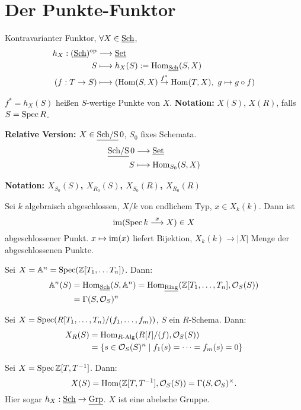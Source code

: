 \section{Der Punkte-Funktor}

Kontravarianter Funktor, $\forall X\in\operatorname{\underline{Sch}}$,
\begin{align*}
  h_{X}:(\operatorname{\underline{Sch}})^{\operatorname{op}} & \longrightarrow\operatorname{\underline{Set}}\\
  S & \longmapsto h_{X}(S):=\operatorname{\mathrm{Hom}}_{\operatorname{\underline{Sch}}}(S,X)\\
  (f:T\rightarrow S) & \longmapsto(\operatorname{\mathrm{Hom}}(S,X)\overset{f^{\ast}}{\rightarrow}\operatorname{\mathrm{Hom}}(T,X),\ g\mapsto g\circ f)
\end{align*}

$f^{\ast}=h_{X}(S)$ heißen $S$-wertige Punkte von $X$. \textbf{Notation:
}$X(S)$, $X(R)$, falls $S=\operatorname{Spec} R$.

\textbf{Relative Version:} $X\in\operatorname{\underline{Sch/S}}0$, $S_{0}$ fixes Schemata.
\begin{align*}
  \operatorname{\underline{Sch/S}}0 & \longrightarrow\operatorname{\underline{Set}}\\
  S & \longmapsto\operatorname{\mathrm{Hom}}_{S_{0}}(S,X)
\end{align*}

\textbf{Notation: $X_{S_{0}}(S)$, $X_{R_{0}}(S)$, $X_{S_{0}}(R)$,
  $X_{R_{0}}(R)$}
\begin{example}[1]
  Sei $k$ algebraisch abgeschlossen, $X/k$ von endlichem Typ, $x\in X_{k}(k)$.
  Dann ist
  \[
    \operatorname{\mathrm{im}}(\operatorname{Spec} k\overset{x}{\longrightarrow}X)\in X
  \]
  abgeschlossener Punkt. $x\mapsto\operatorname{\mathrm{im}}(x)$ liefert Bijektion, $X_{k}(k)\rightarrow|X|$
  Menge der abgeschlossenen Punkte.
\end{example}

\begin{example}[2]
  Sei $X=\mathbb{A}^{n}=\operatorname{Spec}(\mathbb{Z}[T_{1},\ldots T_{n}])$. Dann:
  \begin{align*}
    \mathbb{A}^{n}(S) & =\operatorname{\mathrm{Hom}}_{\operatorname{\underline{Sch}}}(S,\mathbb{A}^{n})=\operatorname{\mathrm{Hom}}_{\operatorname{\underline{Ring}}}(\mathbb{Z}[T_{1},\ldots,T_{n}],\mathcal{O}_{S}(S))\\
                      & =\Gamma(S,\mathcal{O}_{S})^{n}
  \end{align*}
\end{example}

\begin{example}[3]
  Sei $X=\operatorname{Spec}(R[T_{1},\ldots,T_{n})/(f_{1},\ldots,f_{m}))$, $S$ ein
  $R$-Schema. Dann:
  \begin{align*}
    X_{R}(S) & =\operatorname{\mathrm{Hom}}_{R\text{-Alg}}(R[I]/(f),\mathcal{O}_{S}(S))\\
             & =\{s\in\mathcal{O}_{S}(S)^{n}\mid f_{1}(s)=\cdots=f_{m}(s)=0\}
  \end{align*}
\end{example}

\begin{example}[4]
  Sei $X=\operatorname{Spec}\mathbb{Z}[T,T^{-1}]$. Dann:
  \[
    X(S)=\operatorname{\mathrm{Hom}}(\mathbb{Z}[T,T^{-1}],\mathcal{O}_{S}(S))=\Gamma(S,\mathcal{O}_{S})^{\times}.
  \]
  Hier sogar $h_{X}:\operatorname{\underline{Sch}}\rightarrow\operatorname{\underline{Grp}}$. $X$ ist eine abelsche Gruppe.
\end{example}
